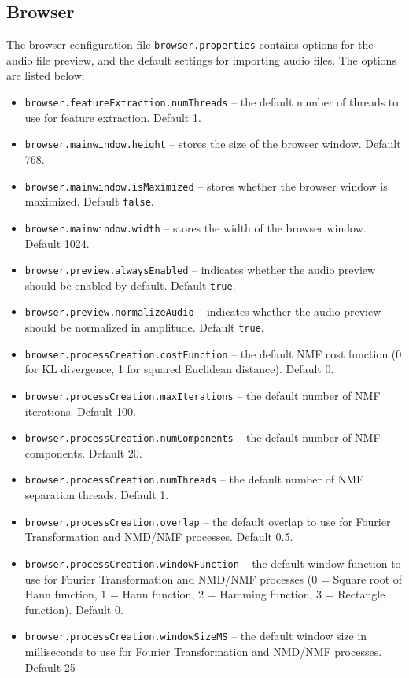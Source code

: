\subsection{Browser}

The browser configuration file {\tt browser.properties} contains options for
the audio file preview, and the default settings for importing audio files.
The options are listed below:

\begin{itemize}
  \item {\tt browser.featureExtraction.numThreads} -- the default number of threads to use for feature extraction. Default 1.
  \item {\tt browser.mainwindow.height} -- stores the size of the browser window. Default 768.
  \item {\tt browser.mainwindow.isMaximized} -- stores whether the browser window is maximized. Default {\tt false}.
  \item {\tt browser.mainwindow.width} -- stores the width of the browser window. Default 1024.
  \item {\tt browser.preview.alwaysEnabled} -- indicates whether the audio preview should be enabled by default. Default {\tt true}.
  \item {\tt browser.preview.normalizeAudio} -- indicates whether the audio preview should be normalized in amplitude. Default {\tt true}.
  \item {\tt browser.processCreation.costFunction} -- the default NMF cost function (0 for KL divergence, 1 for squared Euclidean distance). Default 0.
  \item {\tt browser.processCreation.maxIterations} -- the default number of NMF iterations. Default 100.
  \item {\tt browser.processCreation.numComponents} -- the default number of NMF components. Default 20.
  \item {\tt browser.processCreation.numThreads} -- the default number of NMF separation threads. Default 1.
  \item {\tt browser.processCreation.overlap} -- the default overlap to use for Fourier Transformation and NMD/NMF processes. Default 0.5.
  \item {\tt browser.processCreation.windowFunction} -- the default window function to use for Fourier Transformation and NMD/NMF processes (0 = Square root of Hann function, 1 = Hann function, 2 = Hamming function, 3 = Rectangle function). Default 0.
  \item {\tt browser.processCreation.windowSizeMS} -- the default window size in milliseconds to use for Fourier Transformation and NMD/NMF processes. Default 25
\end{itemize}
